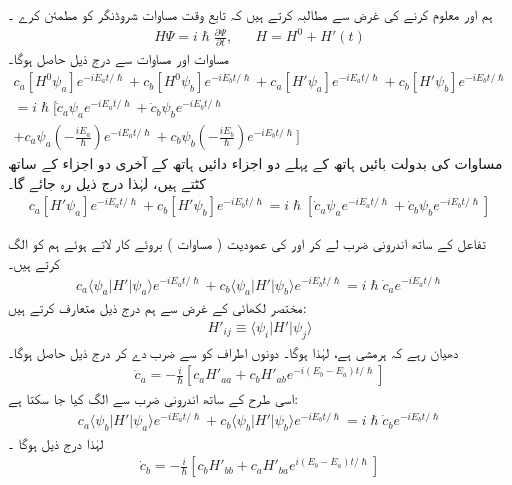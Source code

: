 ہم  اور  معلوم کرنے کی غرض سے مطالبہ کرتے ہیں کہ  تابع وقت مساوات شروڈنگر کو مطمئن کرے ۔
\begin{align}\label{مساوات_مضطرب_مطمئن}
	H\Psi=i\hslash\frac{\partial\Psi}{\partial t},&&H=H^0+H'(t)
\end{align}
مساوات  اور مساوات   سے درج ذیل حاصل ہوگا۔
\begin{multline*}
	c_a[H^0\psi_a]e^{-iE_at/\hslash}+c_b[H^0\psi_b]e^{-iE_bt/\hslash}+c_a[H'\psi_a]e^{-iE_at/\hslash}+c_b[H'\psi_b]e^{-iE_bt/\hslash} \\
	=i\hslash\Big[\dot{c}_a\psi_ae^{-iE_at/\hslash}+\dot{c}_b\psi_be^{-iE_bt/\hslash}\\
	+c_a\psi_a\left(-\frac{iE_a}{\hslash}\right)e^{-iE_at/\hslash}+c_b\psi_b\left(-\frac{iE_b}{\hslash}\right)e^{-iE_bt/\hslash}\Big]
\end{multline*}
مساوات   کی بدولت بائیں ہاتھ کے پہلے دو اجزاء  دائیں ہاتھ کے آخری دو اجزاء کے ساتھ کٹتے  ہیں،  لہٰذا درج ذیل رہ جائے  گا۔
\begin{align}
	c_a[H'\psi_a]e^{-iE_at/\hslash}+c_b[H'\psi_b]e^{-iE_bt/\hslash}=i\hslash\left[\dot{c}_a\psi_ae^{-iE_at/\hslash}+\dot{c}_b\psi_be^{-iE_bt/\hslash}\right]
\end{align}

تفاعل  کے ساتھ اندرونی ضرب لے کر  اور  کی عمودیت ( مساوات )  بروئے کار لاتے ہوئے ہم   کو الگ کرتے ہیں۔
\begin{align*}
	c_a\langle\psi_a| H'|\psi_a\rangle e^{-iE_at/\hslash}+c_b\langle\psi_a| H'|\psi_b\rangle e^{-iE_bt/\hslash}=i\hslash\dot{c}_ae^{-iE_at/\hslash}
\end{align*}
مختصر لکھائی کے غرض سے ہم درج ذیل متعارف کرتے ہیں:
\begin{align}
	H'_{ij}\equiv\langle\psi_i| H'|\psi_j\rangle
\end{align}
دھیان رہے کہ   ہرمشی ہے،  لہٰذا  ہوگا۔ دونوں اطراف کو  سے ضرب دے کر درج ذیل حاصل ہوگا۔
\begin{align}\label{مساوات_مضطرب_تحویلی_شرح_الف}
	\dot{c}_a=-\frac{i}{\hslash}\left[c_aH'_{aa}+c_bH'_{ab}e^{-i(E_b-E_a)t/\hslash}\right]
\end{align}
اسی طرح  کے ساتھ اندرونی ضرب سے  الگ کیا جا سکتا ہے:
\begin{align*}
	c_a\langle\psi_b| H'|\psi_a\rangle e^{-iE_at/\hslash}+c_b\langle\psi_b| H'|\psi_b\rangle e^{-iE_bt/\hslash}=i\hslash\dot{c}_be^{-iE_bt/\hslash}
\end{align*}
لہٰذا درج ذیل ہوگا ۔
\begin{align}\label{مساوات_مضطرب_تحویلی_شرح_ب}
	\dot{c}_b=-\frac{i}{\hslash}\left[c_bH'_{bb}+c_aH'_{ba}e^{i(E_b-E_a)t/\hslash}\right]
\end{align}

